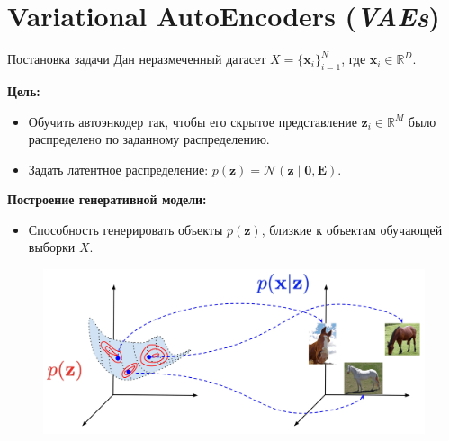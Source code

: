 \section{Variational AutoEncoders (\textit{VAEs})}

\begin{frame}[allowframebreaks]{Постановка задачи}
    Дан неразмеченный датасет $X = \{\boldsymbol{x}_i\}_{i=1}^N$, где $\boldsymbol{x}_i \in \mathbb{R}^D$.

    \textbf{Цель:}
    \begin{itemize}
        \item Обучить автоэнкодер так, чтобы его скрытое представление $\boldsymbol{z}_i \in \mathbb{R}^M$ было распределено по заданному распределению.
        \item Задать латентное распределение: $p(\boldsymbol{z}) = \mathcal{N}(\boldsymbol{z} \mid \mathbf{0}, \mathbf{E})$.
    \end{itemize}

    \textbf{Построение генеративной модели:}
    \begin{itemize}
        \item Способность генерировать объекты $p(\boldsymbol{z})$, близкие к объектам обучающей выборки $X$.
    \end{itemize}

    \begin{figure}
        \centering
        \includegraphics[width=.8\textwidth]{../resources/vae/sampling.png}
    \end{figure}
\end{frame}

